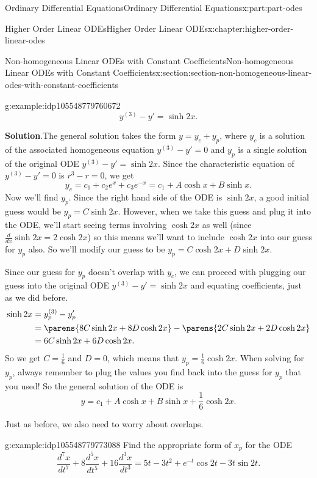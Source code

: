 \documentclass[oneside,10pt,]{book}
\newcommand{\blocktitlefont}{\relax}
\numberwithin{equation}{part}
\newcommand{\dv}[3][]{\dfrac{d^{#1} #2}{d #3^{#1}}}
\newcommand{\amp}{&}
\begin{document}
\begin{partptx}{Ordinary Differential Equations}{}{Ordinary Differential Equations}{}{}{x:part:part-odes}
\begin{chapterptx}{Higher Order Linear ODEs}{}{Higher Order Linear ODEs}{}{}{x:chapter:higher-order-linear-odes}
\begin{sectionptx}{Non-homogeneous Linear ODEs with Constant Coefficients}{}{Non-homogeneous Linear ODEs with Constant Coefficients}{}{}{x:section:section-non-homogeneous-linear-odes-with-constant-coefficients}
\begin{example}{}{g:example:idp105548779760672}
\begin{equation*}
y^{(3)}-y' = \sinh 2x.
\end{equation*}
%
\par\smallskip%
\noindent\textbf{\blocktitlefont Solution}.\hypertarget{g:solution:idp105548779761568}{}\quad{}The general solution takes the form \(y = y_{c}+y_{p}\), where \(y_{c}\) is a solution of the associated homogeneous equation \(y^{(3)}-y'=0\) and \(y_{p}\) is a single solution of the original ODE \(y^{(3)}-y'=\sinh 2x\). Since the characteristic equation of \(y^{(3)}-y'=0\) is \(r^{3}-r=0\), we get%
\begin{equation*}
y_{c} = c_{1}+c_{2}e^{x}+c_{3}e^{-x} = c_{1}+A\cosh x+B\sinh x.
\end{equation*}
Now we'll find \(y_{p}\). Since the right hand side of the ODE is \(\sinh 2x\), a good initial guess would be \(y_{p} = C\sinh 2x\). However, when we take this guess and plug it into the ODE, we'll start seeing terms involving \(\cosh 2x\) as well (since \(\frac{d}{dx}\sinh 2x = 2\cosh 2x\)) so this means we'll want to include \(\cosh 2x\) into our guess for \(y_{p}\) also. So we'll modify our guess to be \(y_{p} = C\cosh 2x+D\sinh 2x\).%
\par
Since our guess for \(y_{p}\) doesn't overlap with \(y_{c}\), we can proceed with plugging our guess into the original ODE \(y^{(3)}-y'=\sinh 2x\) and equating coefficients, just as we did before.%
\begin{align*}
\sinh 2x \amp= y^{(3)}_{p}-y'_{p}\\
\amp= \parens{8C\sinh2x+8D\cosh2x}-\parens{2C\sinh2x+2D\cosh2x}\\
\amp= 6C\sinh2x+6D\cosh2x.
\end{align*}
So we get \(C = \frac{1}{6}\) and \(D=0\), which means that \(y_{p} = \frac{1}{6}\cosh2x\). When solving for \(y_{p}\), always remember to plug the values you find back into the guess for \(y_{p}\) that you used! So the general solution of the ODE is%
\begin{equation*}
y = c_{1}+A\cosh x+B\sinh x+\frac{1}{6}\cosh2x.
\end{equation*}
%
\end{example}
Just as before, we also need to worry about overlaps.%
\begin{example}{}{g:example:idp105548779773088}%
Find the appropriate form of \(x_{p}\) for the ODE%
\begin{equation*}
\dv[7]{x}{t}+8\dv[5]{x}{t}+16\dv[3]{x}{t} = 5t-3t^{2}+e^{-t}\cos2t-3t\sin2t.
\end{equation*}
%
\par\smallskip%

\end{example}
\end{sectionptx}
\end{chapterptx}
\end{partptx}
\end{document}
